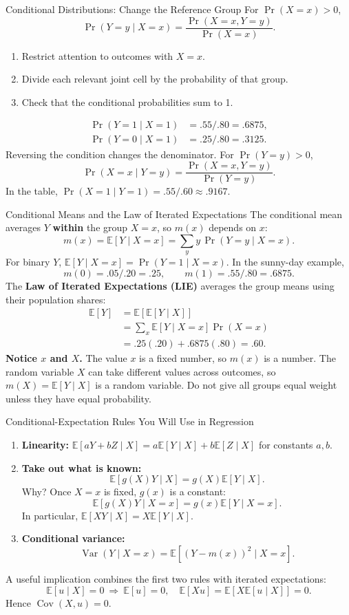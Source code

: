 \documentclass[10pt,aspectratio=169]{beamer}
\newcommand{\E}{\mathbb{E}}
\newcommand{\Var}{\operatorname{Var}}
\newcommand{\Cov}{\operatorname{Cov}}
\newcommand{\Prb}{\operatorname{Pr}}
\begin{document}
\begin{frame}{Conditional Distributions: Change the Reference Group}
For $\Prb(X=x)>0$,
\[
\Prb(Y=y\mid X=x)=\frac{\Prb(X=x,Y=y)}{\Prb(X=x)}.
\]
\begin{enumerate}
\item Restrict attention to outcomes with $X=x$.
\item Divide each relevant joint cell by the probability of that group.
\item Check that the conditional probabilities sum to 1.
\end{enumerate}
\begin{align*}
\Prb(Y=1\mid X=1)&=.55/.80=.6875,\\
\Prb(Y=0\mid X=1)&=.25/.80=.3125.
\end{align*}
Reversing the condition changes the denominator. For $\Prb(Y=y)>0$,
\[
\Prb(X=x\mid Y=y)=\frac{\Prb(X=x,Y=y)}{\Prb(Y=y)}.
\]
In the table, $\Prb(X=1\mid Y=1)=.55/.60\approx .9167$.
\end{frame}

\begin{frame}{Conditional Means and the Law of Iterated Expectations}
\small
The conditional mean averages $Y$ \textbf{within} the group $X=x$, so $m(x)$ depends on $x$:
\[
m(x)=\E[Y\mid X=x]=\sum_y y\,\Prb(Y=y\mid X=x).
\]
For binary $Y$, $\E[Y\mid X=x]=\Prb(Y=1\mid X=x)$.
In the sunny-day example,
\[
m(0)=.05/.20=.25,\qquad m(1)=.55/.80=.6875.
\]
The \textbf{Law of Iterated Expectations (LIE)} averages the group means using their population shares:
\begin{align*}
\E[Y]&=\E[\E[Y\mid X]]\\
&=\sum_x \E[Y\mid X=x]\Prb(X=x)\\
&=.25(.20)+.6875(.80)=.60.
\end{align*}
\textbf{Notice $x$ and $X$.} The value $x$ is a fixed number, so $m(x)$ is a number. The random variable $X$ can take different values across outcomes, so $m(X)=\E[Y\mid X]$ is a random variable.
Do not give all groups equal weight unless they have equal probability.
\end{frame}

\begin{frame}{Conditional-Expectation Rules You Will Use in Regression}
\small
\begin{enumerate}
\item \textbf{Linearity:}
$\E[aY+bZ\mid X]=a\E[Y\mid X]+b\E[Z\mid X]$ for constants $a,b$.
\item \textbf{Take out what is known:}
\[
\E[g(X)Y\mid X]=g(X)\E[Y\mid X].
\]
Why? Once $X=x$ is fixed, $g(x)$ is a constant:
\[
\E[g(X)Y\mid X=x]=g(x)\E[Y\mid X=x].
\]
In particular, $\E[XY\mid X]=X\E[Y\mid X]$.
\item \textbf{Conditional variance:}
\[
\Var(Y\mid X=x)=\E[(Y-m(x))^2\mid X=x].
\]
\end{enumerate}
A useful implication combines the first two rules with iterated expectations:
\[
\E[u\mid X]=0
\ \Longrightarrow\ 
\E[u]=0,\quad \E[Xu]=\E[X\E[u\mid X]]=0.
\]
Hence $\Cov(X,u)=0$.
\end{frame}
\end{document}
